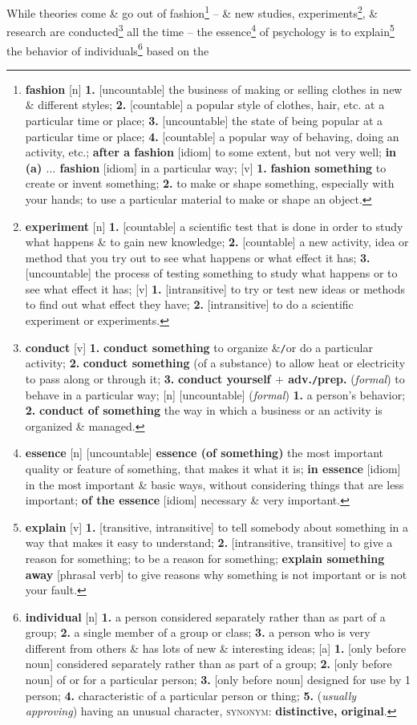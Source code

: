 \documentclass[oneside]{book}
\numberwithin{equation}{section}
\begin{document}
While theories come \& go out of fashion\footnote{\textbf{fashion} [n] \textbf{1.} [uncountable] the business of making or selling clothes in new \& different styles; \textbf{2.} [countable] a popular style of clothes, hair, etc. at a particular time or place; \textbf{3.} [uncountable] the state of being popular at a particular time or place; \textbf{4.} [countable] a popular way of behaving, doing an activity, etc.; \textbf{after a fashion} [idiom] to some extent, but not very well; \textbf{in (a) $\ldots$ fashion} [idiom] in a particular way; [v] \textbf{1.} \textbf{fashion something} to create or invent something; \textbf{2.} to make or shape something, especially with your hands; to use a particular material to make or shape an object.} -- \& new studies, experiments\footnote{\textbf{experiment} [n] \textbf{1.} [countable] a scientific test that is done in order to study what happens \& to gain new knowledge; \textbf{2.} [countable] a new activity, idea or method that you try out to see what happens or what effect it has; \textbf{3.} [uncountable] the process of testing something to study what happens or to see what effect it has; [v] \textbf{1.} [intransitive] to try or test new ideas or methods to find out what effect they have; \textbf{2.} [intransitive] to do a scientific experiment or experiments.}, \& research are conducted\footnote{\textbf{conduct} [v] \textbf{1.} \textbf{conduct something} to organize \&\texttt{/}or do a particular activity; \textbf{2.} \textbf{conduct something} (of a substance) to allow heat or electricity to pass along or through it; \textbf{3.} \textbf{conduct yourself $+$ adv.\texttt{/}prep.} (\textit{formal}) to behave in a particular way; [n] [uncountable] (\textit{formal}) \textbf{1.} a person's behavior; \textbf{2.} \textbf{conduct of something} the way in which a business or an activity is organized \& managed.} all the time -- the essence\footnote{\textbf{essence} [n] [uncountable] \textbf{essence (of something)} the most important quality or feature of something, that makes it what it is; \textbf{in essence} [idiom] in the most important \& basic ways, without considering things that are less important; \textbf{of the essence} [idiom] necessary \& very important.} of psychology is to explain\footnote{\textbf{explain} [v] \textbf{1.} [transitive, intransitive] to tell somebody about something in a way that makes it easy to understand; \textbf{2.} [intransitive, transitive] to give a reason for something; to be a reason for something; \textbf{explain something away} [phrasal verb] to give reasons why something is not important or is not your fault.} the behavior of individuals\footnote{\textbf{individual} [n] \textbf{1.} a person considered separately rather than as part of a group; \textbf{2.} a single member of a group or class; \textbf{3.} a person who is very different from others \& has lots of new \& interesting ideas; [a] \textbf{1.} [only before noun] considered separately rather than as part of a group; \textbf{2.} [only before noun] of or for a particular person; \textbf{3.} [only before noun] designed for use by 1 person; \textbf{4.} characteristic of a particular person or thing; \textbf{5.} (\textit{usually approving}) having an unusual character, \textsc{synonym}: \textbf{distinctive, original}.} based on the 
\end{document}
